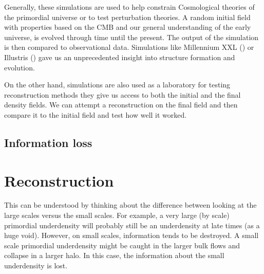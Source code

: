 Generally, these simulations are used to help constrain Cosmological theories of the primordial universe or to test perturbation theories. A random initial field with properties based on the CMB and our general understanding of the early universe, is evolved through time until the present. The output of the simulation is then compared to observational data. Simulations like Millennium XXL (\cite{Millennium_XXL}) or Illustris (\cite{Illustris_sim}) gave us an unprecedented insight into structure formation and evolution.

On the other hand, simulations are also used as a laboratory for testing reconstruction methods they give us access to both the initial and the final density fields. We can attempt a reconstruction on the final field and then compare it to the initial field and test how well it worked. 

\subsection{Information loss}



\section{Reconstruction}

This can be understood by thinking about the difference between looking at the large scales versus the small scales. For example, a very large (by scale) primordial underdensity will probably still be an underdensity at late times (as a huge void). However, on small scales, information tends to be destroyed. A small scale primordial underdensity might be caught in the larger bulk flows and collapse in a larger halo. In this case, the information about the small underdensity is lost. 




    
